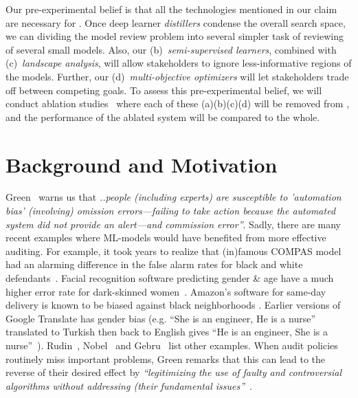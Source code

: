 Our pre-experimental belief is that all the   technologies mentioned in our claim are necessary for {\IT}.
Once deep learner {\em distillers} condense the overall search space, we can dividing the model review problem into several simpler task of  reviewing of several small models.
Also,
our (b)~{\em semi-supervised learners}, combined with (c)~{\em landscape analysis}, will allow stakeholders to  ignore   less-informative regions of the models.
Further,
our (d)~{\em multi-objective optimizers} will 
let stakeholders trade off between competing goals. To assess this pre-experimental belief,
we will   conduct ablation
studies~\cite{cohen1995empirical} where each of these (a)(b)(c)(d) will be removed from {\IT}, and the performance of the ablated system will be compared to the whole. 

\section{Background and Motivation}
Green~\cite{green2022flaws}  warns us that {\em
        ..people (including experts) are susceptible to 'automation bias' (involving)  omission errors—failing to take action because the automated system did not provide an alert—and commission error''}. 
        Sadly,
there are   many recent examples   where  ML-models would have benefited from more effective auditing. 
   For example,  it took years to realize that (in)famous
COMPAS  model had an alarming difference in the false alarm rates for black and white defendants~\cite{Chakraborty2020artifact}. 
Facial recognition software   predicting    gender \& age have a much
higher error rate for dark-skinned women~\cite{Skin_Bias}.
  Amazon's   software for same-day delivery   is known to be   biased against black neighborhoods \cite{Amazon_Bias}. 
 Earlier versions of Google Translate  has gender bias
 (e.g. ``She is an engineer, He is a nurse''   translated to  Turkish then
  back to  English gives ``He is an engineer, She is a nurse''~\cite{Caliskan183}). 
Rudin~\cite{rudin2019explaining}, 
Nobel~\cite{noble2018algorithms} and Gebru~\cite{gebru21} list other examples.
When   audit policies routinely miss important problems,  Green remarks that  this   can lead to the reverse of their desired effect  by {\em ``legitimizing the use of   faulty and controversial algorithms without addressing (their fundamental issues''}~\cite{green2022flaws}. 

 


